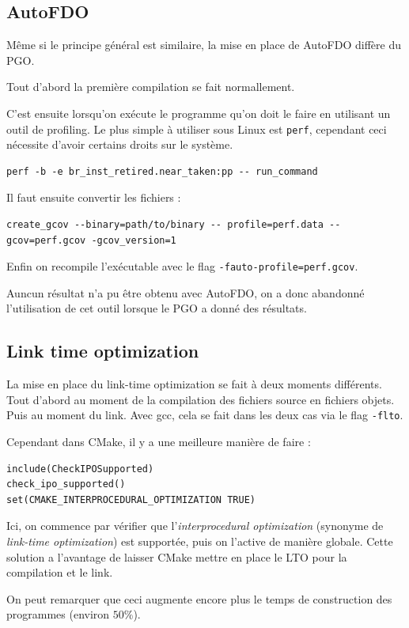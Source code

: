 \documentclass[a4paper]{report}
\begin{document}
\subsection{AutoFDO}
Même si le principe général est similaire, la mise en place de AutoFDO diffère du PGO.

Tout d'abord la première compilation se fait normallement.

C'est ensuite lorsqu'on exécute le programme qu'on doit le faire en utilisant un outil de profiling.
Le plus simple à utiliser sous Linux est \verb'perf', cependant ceci nécessite d'avoir certains droits sur le système.
\begin{verbatim}
perf -b -e br_inst_retired.near_taken:pp -- run_command
            \end{verbatim}
Il faut ensuite convertir les fichiers :
\begin{verbatim}
create_gcov --binary=path/to/binary -- profile=perf.data --gcov=perf.gcov -gcov_version=1
            \end{verbatim}

Enfin on recompile l'exécutable avec le flag \verb'-fauto-profile=perf.gcov'.

Auncun résultat n'a pu être obtenu avec AutoFDO, on a donc abandonné l'utilisation de cet outil lorsque le PGO a donné des résultats.

\subsection{Link time optimization}
La mise en place du link-time optimization se fait à deux moments différents.
Tout d'abord au moment de la compilation des fichiers source en fichiers objets.
Puis au moment du link.
Avec gcc, cela se fait dans les deux cas via le flag \verb'-flto'.

Cependant dans CMake, il y a une meilleure manière de faire :
\begin{verbatim}
include(CheckIPOSupported)
check_ipo_supported()
set(CMAKE_INTERPROCEDURAL_OPTIMIZATION TRUE)
            \end{verbatim}
Ici, on commence par vérifier que l'\emph{interprocedural optimization} (synonyme de \emph{link-time optimization}) est supportée, puis on l'active de manière globale.
Cette solution a l'avantage de laisser CMake mettre en place le LTO pour la compilation et le link.

On peut remarquer que ceci augmente encore plus le temps de construction des programmes (environ $50\%$).
\end{document}
